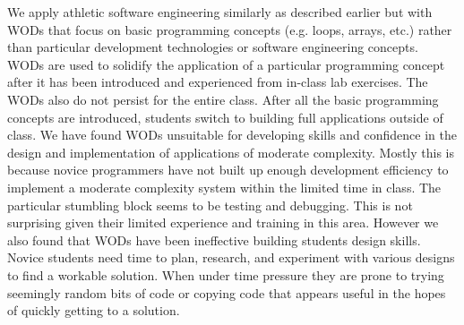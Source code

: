 We apply athletic software engineering similarly as described earlier but with WODs that focus on basic programming concepts (e.g. loops, arrays, etc.) rather than particular development technologies or software engineering concepts. WODs are used to solidify the application of a particular programming concept after it has been introduced and experienced from in-class lab exercises. The WODs also do not persist for the entire class. After all the basic programming concepts are introduced, students switch to building full applications outside of class. We have found WODs unsuitable for developing skills and confidence in the design and implementation of applications of moderate complexity. Mostly this is because novice programmers have not built up enough development efficiency to implement a moderate complexity system within the limited time in class. The particular stumbling block seems to be testing and debugging. This is not surprising given their limited experience and training in this area. However we also found that WODs have been ineffective building students design skills. Novice students need time to plan, research, and experiment with various designs to find a workable solution. When under time pressure they are prone to trying seemingly random bits of code or copying code that appears useful in the hopes of quickly getting to a solution. 
    